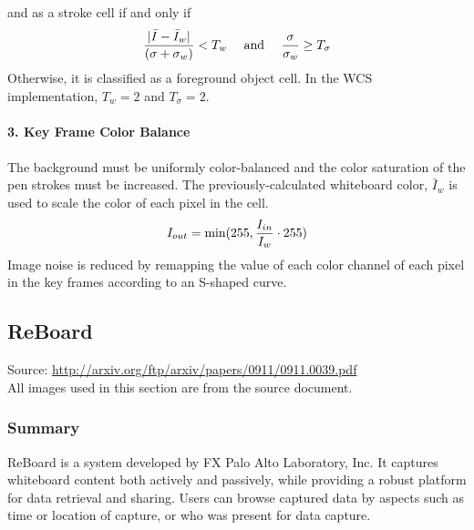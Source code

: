 \documentclass{article}
\begin{document}
and as a stroke cell if and only if
\[{|\bar{I}-\bar{I}_w| \over (\sigma + \sigma_w)}<T_w \quad \textrm{ and } \quad {\sigma \over \sigma_w} \geq T_\sigma \] 
Otherwise, it is classified as a foreground object cell.  In the WCS implementation, $T_w=2$ and $T_\sigma=2$. \\ \\
	\textbf{3. Key Frame Color Balance} \\ \\ 
The background must be uniformly color-balanced and the color saturation of the pen strokes must be increased.  The previously-calculated whiteboard color, $\bar{I}_w$ is used to scale the color of each pixel in the cell. \[ I_{out} = \textrm{min} (255, {I_{in} \over I_w} \cdot 255) \]
Image noise is reduced by remapping the value of each color channel of each pixel in the key frames according to an S-shaped curve.
	
	\subsection*{ReBoard}
Source: {\color{red} \url{http://arxiv.org/ftp/arxiv/papers/0911/0911.0039.pdf}} \\
All images used in this section are from the source document. 
	\subsubsection*{Summary}
ReBoard is a system developed by FX Palo Alto Laboratory, Inc.  It captures whiteboard content both actively and passively, while providing a robust platform for data retrieval and sharing.  Users can browse captured data by aspects such as time or location of capture, or who was present for data capture.  
\end{document}
